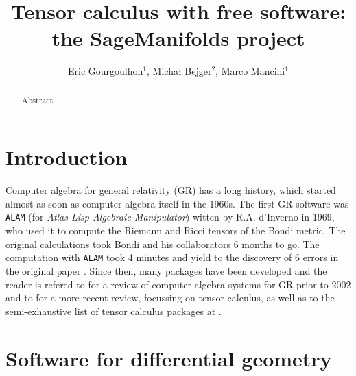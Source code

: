 \documentclass[a4paper]{jpconf}
\newcommand{\soft}[1]{\texttt{#1}}
\begin{document}
\title{Tensor calculus with free software: \\
the SageManifolds project}

\author{Eric Gourgoulhon$^1$, Micha\l{} Bejger$^2$, Marco Mancini$^1$}

\address{$^1$ Laboratoire Univers et Th\'eories, UMR 8102 du 
CNRS, Observatoire de Paris, Universit\'e Paris Diderot,
92190 Meudon, France}

\address{$^2$ Centrum Astronomiczne im. M. Kopernika, ul. Bartycka 18,
00-716 Warsaw, Poland}


\begin{abstract}
Abstract
\end{abstract}

\section{Introduction}

Computer algebra for general relativity (GR) has a long history, which started
almost as soon as computer algebra itself in the 1960s. 
The first GR software was \soft{ALAM} (for \emph{Atlas Lisp Algebraic Manipulator})
witten by R.A. d'Inverno in 1969, who used it to compute
the Riemann and Ricci tensors of the Bondi metric. The original calculations took Bondi and his collaborators 6 months to go. The computation with \soft{ALAM} took 4 minutes and yield to the discovery of 6 errors in the original paper \cite{Skea94}. 
Since then, many packages have been developed and the reader is refered to \cite{MacCa02}
for a review of computer algebra
systems for GR prior to 2002 and to \cite{KorolKS13} for a more recent review,
focussing on tensor calculus, as well as to the semi-exhaustive list of
tensor calculus packages at \cite{xact_links}.


\section{Software for differential geometry}
\end{document}
